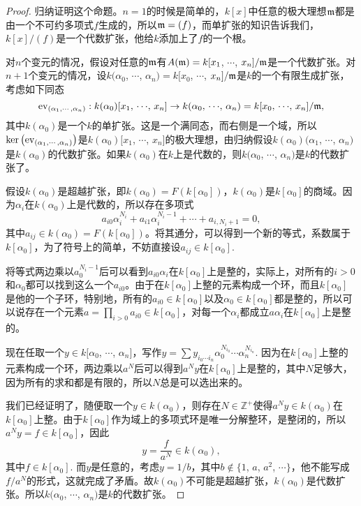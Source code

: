 \begin{proof} 
	归纳证明这个命题。$n=1$的时候是简单的，$k[x]$中任意的极大理想$\mathfrak{m}$都是由一个不可约多项式$f$生成的，所以$\mathfrak{m}=(f)$，而单扩张的知识告诉我们，$k[x]/(f)$是一个代数扩张，他给$k$添加上了$f$的一个根。

	对$n$个变元的情况，假设对任意的$\mathfrak{m}$有$A(\mathfrak{m})=k[x_1$, $\cdots$, $x_n]/\mathfrak{m}$是一个代数扩张。对$n+1$个变元的情况，设$k(\alpha_0$, $\cdots$, $\alpha_{n})=k[x_0$, $\cdots$, $x_n]/\mathfrak{m}$是$k$的一个有限生成扩张，考虑如下同态
	\[
		\operatorname{ev}_{(\alpha_1,\cdots,\alpha_n)}:k(\alpha_0)[x_1,\,\cdots\!,\,x_{n}]\to k(\alpha_0,\,\cdots\!,\,\alpha_{n})=k[x_0,\,\cdots\!,\,x_n]/\mathfrak{m},
	\]
	其中$k(\alpha_0)$是一个$k$的单扩张。这是一个满同态，而右侧是一个域，所以$\ker\left(\operatorname{ev}_{(\alpha_1,\cdots,\alpha_n)}\right)$是$k(\alpha_0)[x_1$, $\cdots$, $x_{n}]$的极大理想，由归纳假设$k(\alpha_0)(\alpha_1$, $\cdots$, $\alpha_{n})$是$k(\alpha_0)$的代数扩张。如果$k(\alpha_0)$在$k$上是代数的，则$k(\alpha_0$, $\cdots$, $\alpha_{n})$是$k$的代数扩张了。

	假设$k(\alpha_0)$是超越扩张，即$k(\alpha_0)=F(k[\alpha_0])$，$k(\alpha_0)$是$k[\alpha_0]$的商域。因为$\alpha_i$在$k(\alpha_0)$上是代数的，所以存在多项式
	\[
		a_{i0}\alpha_i^{N_i}+a_{i1}\alpha_i^{N_i-1}+\cdots +a_{i,N_i+1}=0,
	\]
	其中$a_{ij}\in k(\alpha_0)=F(k[\alpha_0])$。将其通分，可以得到一个新的等式，系数属于$k[\alpha_0]$，为了符号上的简单，不妨直接设$a_{ij}\in k[\alpha_0]$.

	将等式两边乘以$a_0^{N_i-1}$后可以看到$a_{i0}\alpha_i$在$k[\alpha_0]$上是整的，实际上，对所有的$i>0$和$\alpha_0$都可以找到这么一个$a_{i0}$。由于在$k[\alpha_0]$上整的元素构成一个环，而且$k[\alpha_0]$是他的一个子环，特别地，所有的$a_{i0}\in k[\alpha_0]$以及$\alpha_0\in k[\alpha_0]$都是整的，所以可以说存在一个元素$a=\prod_{i>0}a_{i0}\in k[\alpha_0]$，对每一个$\alpha_i$都成立$a\alpha_i$在$k[\alpha_0]$上是整的。

	现在任取一个$y\in k[\alpha_0$, $\cdots$, $\alpha_n]$，写作$y=\sum y_{i_0 \cdots i_n}\alpha_0^{N_{i_0}}\cdots\alpha_{n}^{N_{i_n}}$.
	因为在$k[\alpha_0]$上整的元素构成一个环，两边乘以$a^N$后可以得到$a^Ny$在$k[\alpha_0]$上是整的，其中$N$足够大，因为所有的求和都是有限的，所以$N$总是可以选出来的。

	我们已经证明了，随便取一个$y\in k(\alpha_0)$，则存在$N\in \mathbb{Z}^+$使得$a^Ny\in k(\alpha_0)$在$k[\alpha_0]$上整。由于$k[\alpha_0]$作为域上的多项式环是唯一分解整环，是整闭的，所以$a^Ny=f\in k[\alpha_0]$，因此
	\[
		y=\frac{f}{a^N}\in k(\alpha_0),
	\]
	其中$f\in k[\alpha_0]$. 而$y$是任意的，考虑$y=1/b$，其中$b\not\in \{1$, $a$, $a^2$, $\cdots\}$，他不能写成$f/a^N$的形式，这就完成了矛盾。故$k(\alpha_0)$不可能是超越扩张，$k(\alpha_0)$是代数扩张。所以$k(\alpha_0$, $\cdots$, $\alpha_{n})$是$k$的代数扩张。\end{proof}


